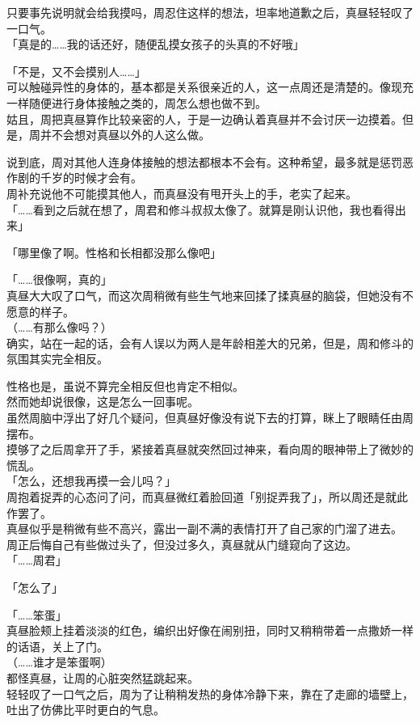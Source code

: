 只要事先说明就会给我摸吗，周忍住这样的想法，坦率地道歉之后，真昼轻轻叹了一口气。\\

「真是的……我的话还好，随便乱摸女孩子的头真的不好哦」

「不是，又不会摸别人……」\\

可以触碰异性的身体的，基本都是关系很亲近的人，这一点周还是清楚的。像现充一样随便进行身体接触之类的，周怎么想也做不到。\\

姑且，周把真昼算作比较亲密的人，于是一边确认着真昼并不会讨厌一边摸着。但是，周并不会想对真昼以外的人这么做。

说到底，周对其他人连身体接触的想法都根本不会有。这种希望，最多就是惩罚恶作剧的千岁的时候才会有。\\

周补充说他不可能摸其他人，而真昼没有甩开头上的手，老实了起来。\\

「……看到之后就在想了，周君和修斗叔叔太像了。就算是刚认识他，我也看得出来」

「哪里像了啊。性格和长相都没那么像吧」

「……很像啊，真的」\\

真昼大大叹了口气，而这次周稍微有些生气地来回揉了揉真昼的脑袋，但她没有不愿意的样子。\\

（……有那么像吗？）\\

确实，站在一起的话，会有人误以为两人是年龄相差大的兄弟，但是，周和修斗的氛围其实完全相反。

性格也是，虽说不算完全相反但也肯定不相似。\\

然而她却说很像，这是怎么一回事呢。\\

虽然周脑中浮出了好几个疑问，但真昼好像没有说下去的打算，眯上了眼睛任由周摆布。\\

摸够了之后周拿开了手，紧接着真昼就突然回过神来，看向周的眼神带上了微妙的慌乱。\\

「怎么，还想我再摸一会儿吗？」\\

周抱着捉弄的心态问了问，而真昼微红着脸回道「别捉弄我了」，所以周还是就此作罢了。\\

真昼似乎是稍微有些不高兴，露出一副不满的表情打开了自己家的门溜了进去。\\

周正后悔自己有些做过头了，但没过多久，真昼就从门缝窥向了这边。\\

「……周君」

「怎么了」

「……笨蛋」\\

真昼脸颊上挂着淡淡的红色，编织出好像在闹别扭，同时又稍稍带着一点撒娇一样的话语，关上了门。\\

（……谁才是笨蛋啊）\\

都怪真昼，让周的心脏突然猛跳起来。\\

轻轻叹了一口气之后，周为了让稍稍发热的身体冷静下来，靠在了走廊的墙壁上，吐出了仿佛比平时更白的气息。
